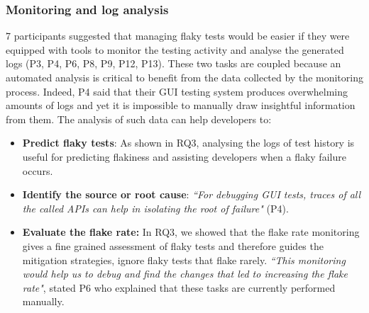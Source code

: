 \subsubsection{\textbf{Monitoring and log analysis}}
7 participants suggested that managing flaky tests would be easier if they were equipped with tools to monitor the testing activity and analyse the generated logs (P3, P4, P6, P8, P9, P12, P13).
These two tasks are coupled because an automated analysis is critical to benefit from the data collected by the monitoring process.
Indeed, P4 said that their GUI testing system produces overwhelming amounts of logs and yet it is impossible to manually draw insightful information from them.
The analysis of such data can help developers to: 
\begin{itemize}[wide=10pt,noitemsep,topsep=0pt,label={}]
    \item\textbf{Predict flaky tests}: As shown in \textsc{RQ3}, analysing the logs of test history is useful for predicting flakiness and assisting developers when a flaky failure occurs.
    \item \textbf{Identify the source or root cause}: \textit{``For debugging GUI tests, traces of all the called APIs can help in isolating the root of failure"} (P4).
    \item \textbf{Evaluate the flake rate:} In \textsc{RQ3}, we showed that the flake rate monitoring gives a fine grained assessment of flaky tests and therefore guides the mitigation strategies, \eg ignore flaky tests that flake rarely.
    \textit{``This monitoring would help us to debug and find the changes that led to increasing the flake rate"}, stated P6 who explained that these tasks are currently performed manually.
\end{itemize}

